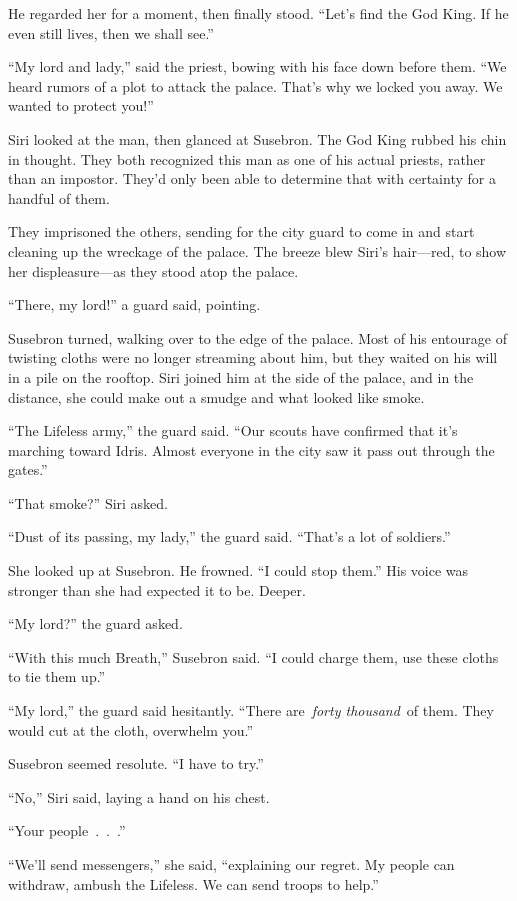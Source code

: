 He regarded her for a moment, then finally stood. “Let’s find the God King. If he even still lives, then we shall see.”

\orn

“My lord and lady,” said the priest, bowing with his face down before them. “We heard rumors of a plot to attack the palace. That’s why we locked you away. We wanted to protect you!”

Siri looked at the man, then glanced at Susebron. The God King rubbed his chin in thought. They both recognized this man as one of his actual priests, rather than an impostor. They’d only been able to determine that with certainty for a handful of them.

They imprisoned the others, sending for the city guard to come in and start cleaning up the wreckage of the palace. The breeze blew Siri’s hair—red, to show her displeasure—as they stood atop the palace.

“There, my lord!” a guard said, pointing.

Susebron turned, walking over to the edge of the palace. Most of his entourage of twisting cloths were no longer streaming about him, but they waited on his will in a pile on the rooftop. Siri joined him at the side of the palace, and in the distance, she could make out a smudge and what looked like smoke.

“The Lifeless army,” the guard said. “Our scouts have confirmed that it’s marching toward Idris. Almost everyone in the city saw it pass out through the gates.”

“That smoke?” Siri asked.

“Dust of its passing, my lady,” the guard said. “That’s a lot of soldiers.”

She looked up at Susebron. He frowned. “I could stop them.” His voice was stronger than she had expected it to be. Deeper.

“My lord?” the guard asked.

“With this much Breath,” Susebron said. “I could charge them, use these cloths to tie them up.”

“My lord,” the guard said hesitantly. “There are~\textit{forty thousand}~of them. They would cut at the cloth, overwhelm you.”

Susebron seemed resolute. “I have to try.”

“No,” Siri said, laying a hand on his chest.

“Your people~.~.~.”

“We’ll send messengers,” she said, “explaining our regret. My people can withdraw, ambush the Lifeless. We can send troops to help.”

